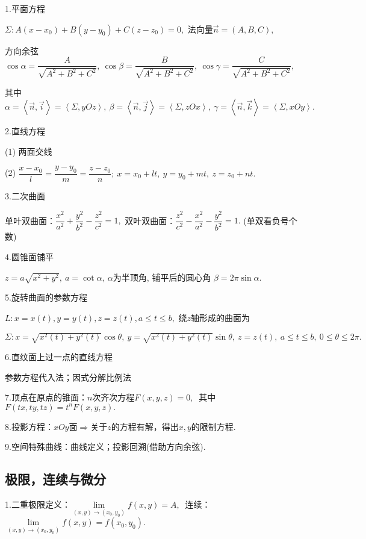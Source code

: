 \documentclass[UTF8]{ctexart}
\newcommand\no{\noindent}
\newcommand\dis{\displaystyle}
\newcommand\ls{\leqslant}
\newcommand\limit{\dis\lim\limits}
\begin{document}
\begin{spacing}{2}
\no1.平面方程

$\dis\Sigma:A(x-x_0)+B(y-y_0)+C(z-z_0)=0,$ 法向量$\stackrel{\rightarrow}{n}=
(A,B,C),$

方向余弦$\dis\cos\alpha=\dfrac{A}{\sqrt{A^2+B^2+C^2}},\ 
\cos\beta=\dfrac{B}{\sqrt{A^2+B^2+C^2}},\ 
\cos\gamma=\dfrac{C}{\sqrt{A^2+B^2+C^2}},$ 

其中$\alpha=\left<\stackrel{\rightarrow}{n},\stackrel{\rightarrow}{i}\right>
=\left<\Sigma,yOz\right>,\ 
\beta=\left<\stackrel{\rightarrow}{n},\stackrel{\rightarrow}{j}\right>
=\left<\Sigma,zOx\right>,\ 
\gamma=\left<\stackrel{\rightarrow}{n},\stackrel{\rightarrow}{k}\right>
=\left<\Sigma,xOy\right>.$

\no2.直线方程

(1) 两面交线

(2) $\dfrac{x-x_0}{l}=\dfrac{y-y_0}{m}=\dfrac{z-z_0}{n};\ x=x_0+lt,\ 
y=y_0+mt,\ z=z_0+nt.$

\no3.二次曲面

单叶双曲面：$\dfrac{x^2}{a^2}+\dfrac{y^2}{b^2}-\dfrac{z^2}{c^2}=1,$
 双叶双曲面：$\dfrac{z^2}{c^2}-\dfrac{x^2}{a^2}-\dfrac{y^2}{b^2}=1.$
(单双看负号个数)

\no4.圆锥面铺平

$\dis z=a\sqrt{x^2+y^2},\ a=\cot \alpha,\ \alpha$为半顶角, 铺平后的圆心角
$\beta=2\pi\sin\alpha.$

\no5.旋转曲面的参数方程

$L:x=x(t),y=y(t),z=z(t),a\ls t\ls b,$ 绕$z$轴形成的曲面为

$\dis\Sigma: x=\sqrt{x^2(t)+y^2(t)}\cos\theta,\ 
y=\sqrt{x^2(t)+y^2(t)}\sin\theta,\ z=z(t),\ a\ls t\ls b,\ 0\ls\theta\ls 2\pi.$

\no6.直纹面上过一点的直线方程

参数方程代入法；因式分解比例法

\no7.顶点在原点的锥面：$n$次齐次方程$F(x,y,z)=0,\ $
其中$F(tx,ty,tz)=t^nF(x,y,z).$

\no8.投影方程：$xOy$面$\Longrightarrow$关于$z$的方程有解，得出$x,y$的限制方程.

\no9.空间特殊曲线：曲线定义；投影回溯(借助方向余弦).

\subsection{极限，连续与微分}

\no1.二重极限定义：$\limit_{(x,y)\to(x_0,y_0)}f(x,y)=A,\ $  
 连续：$\limit_{(x,y)\to(x_0,y_0)}f(x,y)=f(x_0,y_0).$


\end{spacing}
\end{document}
